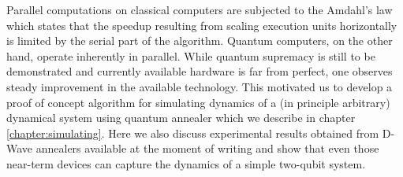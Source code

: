 Parallel computations on classical computers are subjected to the Amdahl's law which states that the speedup resulting from scaling execution units horizontally is limited by the serial part of the algorithm. Quantum computers, on the other hand, operate inherently in parallel. While quantum supremacy is still to be demonstrated and currently available hardware is far from perfect, one observes steady improvement in the available technology. This motivated us to develop a proof of concept algorithm for simulating dynamics of a (in principle arbitrary) dynamical system using quantum annealer which we describe in chapter \ref{chapter:simulating}. Here we also discuss experimental results obtained from D-Wave annealers available at the moment of writing and show that even those near-term devices can capture the dynamics of a simple two-qubit system.

